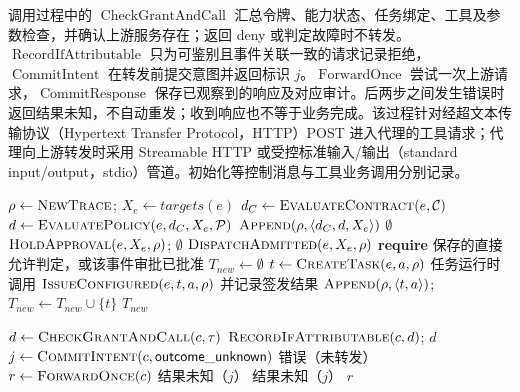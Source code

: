调用过程中的 $\operatorname{CheckGrantAndCall}$ 汇总令牌、能力状态、任务绑定、工具及参数检查，并确认上游服务存在；返回 deny 或判定故障时不转发。$\operatorname{RecordIfAttributable}$ 只为可鉴别且事件关联一致的请求记录拒绝，$\operatorname{CommitIntent}$ 在转发前提交意图并返回标识 $j$。$\operatorname{ForwardOnce}$ 尝试一次上游请求，$\operatorname{CommitResponse}$ 保存已观察到的响应及对应审计。后两步之间发生错误时返回结果未知，不自动重发；收到响应也不等于业务完成。该过程针对经超文本传输协议（Hypertext Transfer Protocol，HTTP）POST 进入代理的工具请求；代理向上游转发时采用 Streamable HTTP 或受控标准输入/输出（standard input/output，stdio）管道。初始化等控制消息与工具业务调用分别记录。

\begin{algorithm}[htbp]
\caption{E2AG 事件准入与任务分发}\label{alg:e2ag-v11}
\begin{algorithmic}[1]
  \State $\rho\gets\Call{NewTrace}{}$; $X_e\gets targets(e)$
  \State $d_C\gets\Call{EvaluateContract}{e,\mathcal C}$
  \State $d\gets\Call{EvaluatePolicy}{e,d_C,X_e,\mathcal P}$
  \State $\Call{Append}{\rho,\langle d_C,d,X_e\rangle}$
   \State \Return $\emptyset$ \EndIf
    \State $\Call{HoldApproval}{e,X_e,\rho}$; \Return $\emptyset$
  \EndIf
  \State \Return $\Call{DispatchAdmitted}{e,X_e,\rho}$
\EndProcedure
{}
  \State \textbf{require} 保存的直接允许判定，或该事件审批已批准
  \State $T_{new}\gets\emptyset$
    \State $t\gets\Call{CreateTask}{e,a,\rho}$
    \State 任务运行时调用 $\Call{IssueConfigured}{e,t,a,\rho}$ 并记录签发结果
    \State $\Call{Append}{\rho,\langle t,a\rangle}$; $T_{new}\gets T_{new}\cup\{t\}$
  \EndFor
  \State \Return $T_{new}$
\EndProcedure
\end{algorithmic}
\end{algorithm}

\begin{algorithm}[htbp]
\caption{E2AG 调用检查与结果记录}\label{alg:e2ag-call-rr022}
\begin{algorithmic}[1]
  \State $d\gets\Call{CheckGrantAndCall}{c,\tau}$
    \State $\Call{RecordIfAttributable}{c,d}$; \Return $d$
  \EndIf
  \State $j\gets\Call{CommitIntent}{c,\mathsf{outcome\_unknown}}$
   \State \Return 错误（未转发） \EndIf
  \State $r\gets\Call{ForwardOnce}{c}$
   \State \Return 结果未知（$j$） \EndIf
    \State \Return 结果未知（$j$）
  \EndIf
  \State \Return $r$
\EndProcedure
\end{algorithmic}
\end{algorithm}

